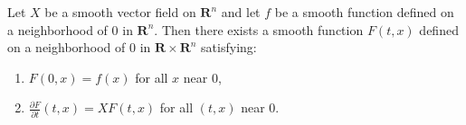 Let $X$ be a smooth vector field on $\mathbf{R}^n$ and let $f$ be a smooth function defined on a neighborhood of $0$ in $\mathbf{R}^n$. Then there exists a smooth function $F(t, x)$ defined on a neighborhood of $0$ in $\mathbf{R} \times \mathbf{R}^n$ satisfying:
\begin{enumerate}
\item $F(0, x) = f(x)$ for all $x$ near $0$,
\item $\displaystyle \frac{\partial F}{\partial t}(t, x) = X F(t, x)$ for all $(t, x)$ near $0$.
\end{enumerate}
